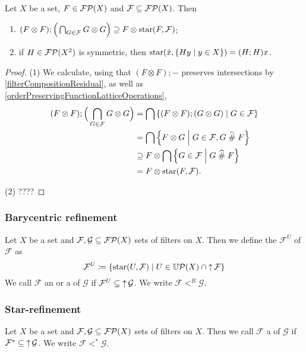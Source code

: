 \begin{lemma}
Let $X$ be a set, $F\in\operatorname{\mathcal{FP}}(X)$ and $\mathcal{F}\subseteq \operatorname{\mathcal{FP}}(X)$. Then
\begin{enumerate}
\item $(F\otimes F);\Big(\bigcap_{G\in \mathcal{F}}G\otimes G\Big) \supseteq F\otimes \operatorname{star}(F, \mathcal{F})$;
\item if $H\in\operatorname{\mathcal{FP}}(X^2)$ is symmetric, then $\starFilter(\pfilter{x}, \setbuilder{Hy}{y\in X}) = (H;H)x$.
\end{enumerate}
\end{lemma}
\begin{proof}
(1) We calculate, using that $(F\otimes F);-$ preserves intersections by \ref{filterCompositionResidual}, as well as \ref{orderPreservingFunctionLatticeOperations},
\begin{align*}
(F\otimes F);\Big(\bigcap_{G\in \mathcal{F}}G\otimes G\Big) &= \bigcap \setbuilder{(F\otimes F); (G\otimes G)}{G\in \mathcal{F}} \\
&= \bigcap \setbuilder{F\otimes G}{G\in \mathcal{F}, G\amesh F} \\
&\supseteq F\otimes \bigcap \setbuilder{G \in \mathcal{F}}{G\amesh F} \\
&= F\otimes \starFilter(F, \mathcal{F}).
\end{align*}

(2) ????
\end{proof}

\subsubsection{Barycentric refinement}
\begin{definition}
Let $X$ be a set and $\mathcal{F},\mathcal{G} \subseteq \operatorname{\mathcal{FP}}(X)$ sets of filters on $X$.
Then we define the  $\mathcal{F}^U$ of $\mathcal{F}$ as
\[ \mathcal{F}^U \defeq \setbuilder{\starFilter(U, \mathcal{F})}{U\in \powerultrafilters(X) \cap \upset\mathcal{F}} \]
We call $\mathcal{F}$ an  or a  of $\mathcal{G}$ if $\mathcal{F}^U \subseteq \operatorname{\uparrow} \mathcal{G}$.
We write $\mathcal{F} <^B \mathcal{G}$.
\end{definition}

\subsubsection{Star-refinement}
\begin{definition}
Let $X$ be a set and $\mathcal{F},\mathcal{G} \subseteq \operatorname{\mathcal{FP}}(X)$ sets of filters on $X$. Then we call $\mathcal{F}$ a  of $\mathcal{G}$ if $\mathcal{F}^* \subseteq \operatorname{\uparrow} \mathcal{G}$. We write $\mathcal{F} <^* \mathcal{G}$.
\end{definition}

